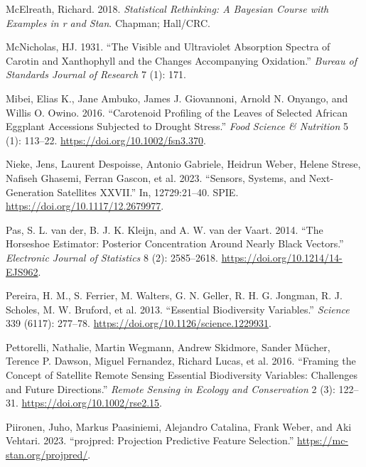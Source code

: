 \documentclass[
  letterpaper,
  DIV=11,
  numbers=noendperiod]{scrartcl}
\newlength{\cslhangindent}
\newlength{\cslentryspacingunit} %
\newenvironment{CSLReferences}[2] %
 {%
  \setlength{\parindent}{0pt}
  \ifodd #1
  \let\oldpar\par
  \def\par{\hangindent=\cslhangindent\oldpar}
  \fi
  \setlength{\parskip}{#2\cslentryspacingunit}
 }%
 {}
\begin{document}
\begin{CSLReferences}{1}{0}
\leavevmode{}%
McElreath, Richard. 2018. \emph{Statistical Rethinking: A Bayesian
Course with Examples in r and Stan}. Chapman; Hall/CRC.

\leavevmode{}%
McNicholas, HJ. 1931. {``The Visible and Ultraviolet Absorption Spectra
of Carotin and Xanthophyll and the Changes Accompanying Oxidation.''}
\emph{Bureau of Standards Journal of Research} 7 (1): 171.

\leavevmode{}%
Mibei, Elias K., Jane Ambuko, James J. Giovannoni, Arnold N. Onyango,
and Willis O. Owino. 2016. {``Carotenoid Profiling of the Leaves of
Selected African Eggplant Accessions Subjected to Drought Stress.''}
\emph{Food Science \& Nutrition} 5 (1): 113--22.
\url{https://doi.org/10.1002/fsn3.370}.

\leavevmode{}%
Nieke, Jens, Laurent Despoisse, Antonio Gabriele, Heidrun Weber, Helene
Strese, Nafiseh Ghasemi, Ferran Gascon, et al. 2023. {``Sensors,
Systems, and Next-Generation Satellites XXVII.''} In, 12729:21--40.
SPIE. \url{https://doi.org/10.1117/12.2679977}.

\leavevmode{}%
Pas, S. L. van der, B. J. K. Kleijn, and A. W. van der Vaart. 2014.
{``The Horseshoe Estimator: Posterior Concentration Around Nearly Black
Vectors.''} \emph{Electronic Journal of Statistics} 8 (2): 2585--2618.
\url{https://doi.org/10.1214/14-EJS962}.

\leavevmode{}%
Pereira, H. M., S. Ferrier, M. Walters, G. N. Geller, R. H. G. Jongman,
R. J. Scholes, M. W. Bruford, et al. 2013. {``Essential Biodiversity
Variables.''} \emph{Science} 339 (6117): 277--78.
\url{https://doi.org/10.1126/science.1229931}.

\leavevmode{}%
Pettorelli, Nathalie, Martin Wegmann, Andrew Skidmore, Sander Mücher,
Terence P. Dawson, Miguel Fernandez, Richard Lucas, et al. 2016.
{``Framing the Concept of Satellite Remote Sensing Essential
Biodiversity Variables: Challenges and Future Directions.''}
\emph{Remote Sensing in Ecology and Conservation} 2 (3): 122--31.
\url{https://doi.org/10.1002/rse2.15}.

\leavevmode{}%
Piironen, Juho, Markus Paasiniemi, Alejandro Catalina, Frank Weber, and
Aki Vehtari. 2023. {``{projpred}: Projection Predictive Feature
Selection.''} \url{https://mc-stan.org/projpred/}.


\end{CSLReferences}
\end{document}

